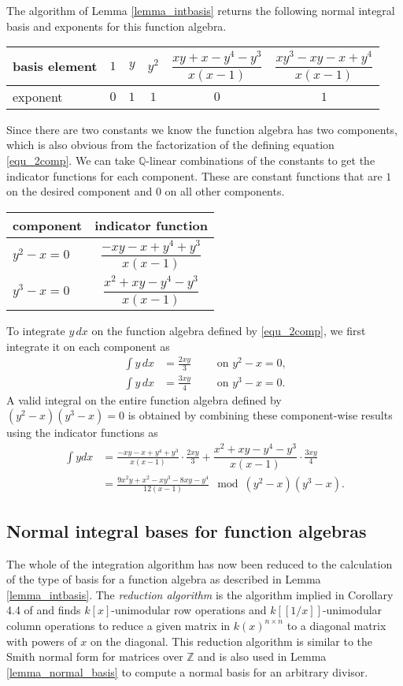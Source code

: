 \documentclass[12pt,reqno]{amsart}
\numberwithin{equation}{section}
\newcommand\T{\rule{0pt}{4.0ex}}       %
\newcommand\B{\rule[-2.5ex]{0pt}{0pt}} %
\newcommand{\bbZ}[0]  { \mathbb{Z}}
\newcommand{\bbQ}[0]  { \mathbb{Q}}
\begin{document}
 The algorithm of Lemma \ref{lemma_intbasis} returns the following normal integral basis and exponents for this function algebra.
\begin{center}
\begin{tabular}{l|ccccc}
\hline
basis element & $1$ & $y$ & $y^2$ & $\dfrac{x y+x-y^4-y^3}{x(x-1)}$ & $\dfrac{x y^3-x y-x+y^4}{x(x-1)}$\T\B\\
\hline
exponent & $0$ & $1$ & $1$ & $0$ & $1$\\
\hline
\end{tabular}
\end{center}
Since there are two constants we know the function algebra has two components, which is also obvious from the factorization of the defining equation \eqref{equ_2comp}. We can take $\bbQ$-linear combinations of the constants to get the indicator functions for each component. These are constant functions that are $1$ on the desired component and $0$ on all other components.
\begin{center}
\begin{tabular}{l|c}
component & indicator function\\
\hline
$y^2-x=0$ & $\dfrac{-x y-x+y^4+y^3}{x(x-1)}$ \T\B\\
$y^3-x=0$ & $\dfrac{x^2+x y-y^4-y^3}{x(x-1)}$\T
\end{tabular}
\end{center}
To integrate $y \, dx$ on the function algebra defined by \eqref{equ_2comp}, we first integrate it on each component as
\begin{align*}
\int y \, dx &= \frac{2x y}{3} \quad \quad \text{ on } y^2-x=0\text{,}\\
\int y \, dx &= \frac{3x y}{4} \quad \quad \text{ on } y^3-x=0\text{.}
\end{align*}
A valid integral on the entire function algebra defined by $(y^2-x)(y^3-x)=0$ is obtained by combining these component-wise results using the indicator functions as
\begin{align*}
\int y dx &= \frac{-x y-x+y^4+y^3}{x(x-1)} \cdot \frac{2x y}{3} + \dfrac{x^2+x y-y^4-y^3}{x(x-1)} \cdot \frac{3x y}{4}\\
&=\frac{9 x^2 y+x^2-x y^3-8 x y-y^4}{12 (x-1)} \mod (y^2-x)(y^3-x)\text{.}
\end{align*}





\subsection{Normal integral bases for function algebras}
The whole of the integration algorithm has now been reduced to the calculation of the type of basis for a function algebra as described in Lemma \ref{lemma_intbasis}. The \emph{reduction algorithm} is the algorithm implied in Corollary 4.4 of \cite{hess} and finds $k[x]$-unimodular row operations and $k[[1/x]]$-unimodular column operations to reduce a given matrix in $k(x)^{n \times n}$ to a diagonal matrix with powers of $x$ on the diagonal. This reduction algorithm is similar to the Smith normal form for matrices over $\bbZ$ and is also used in Lemma \ref{lemma_normal_basis} to compute a normal basis for an arbitrary divisor.
\end{document}
